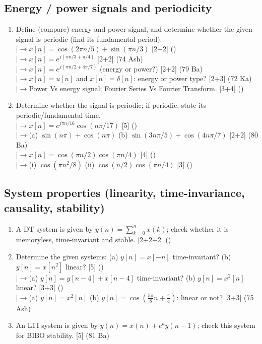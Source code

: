 \documentclass[12pt]{article}
\newcommand{\lb}{\\$\left|\rightarrow\right.$}
\begin{document}
  \subsection{Energy / power signals and periodicity}
    \begin{enumerate}[topsep=0pt, noitemsep]
      \item Define (compare) energy and power signal, and determine whether the given signal is periodic (find its fundamental period).
        \lb $x[n]=\cos(2\pi n/5)+\sin(\pi n/3)$ \hfill [2+2] ()
        \lb $x[n]=e^{j(\pi n/3+\pi/4)}$ \hfill [2+2] (74 Ash)
        \lb $x[n]=e^{j(\pi n/2+4\pi/7)}$ (energy or power?) \hfill [2+2] (79 Ba)
        \lb $x[n]=u[n]$ and $x[n]=\delta[n]$: energy or power type? \hfill [2+3] (72 Ka)
        \lb Power Vs energy signal; Fourier Series Vs Fourier Transform. \hfill [3+4] ()

      \item Determine whether the signal is periodic; if periodic, state its periodic/fundamental time.
        \lb $x[n]=e^{j\pi n/16}\cos(n\pi/17)$ \hfill [5] ()
        \lb (a) $\sin(n\pi)+\cos(n\pi)$ (b) $\sin(3n\pi/5)+\cos(4n\pi/7)$ \hfill [2+2] (80 Ba)
        \lb $x[n]=\cos(\pi n/2)\cos(\pi n/4)$ \hfill [4] ()
        \lb (i) $\cos(\pi n^2/8)$ (ii) $\cos(n/2)\cos(\pi n/4)$ \hfill [3] ()
    \end{enumerate}

  \subsection{System properties (linearity, time-invariance, causality, stability)}
    \begin{enumerate}[topsep=0pt, noitemsep]
      \item A DT system is given by $y(n)=\sum_{k=0}^{n}x(k)$; check whether it is memoryless, time-invariant and stable. \hfill [2+2+2] ()

      \item Determine the given systems: (a) $y[n]=x[-n]$ time-invariant? (b) $y[n]=x[n^2]$ linear? \hfill [5] ()
        \lb (a) $y[n]=y[n-4]+x[n-4]$ time-invariant? (b) $y[n]=x^2[n]$ linear? \hfill [3+3] ()
        \lb (a) $y[n]=x^2[n]$ (b) $y[n]=\cos(\tfrac{5\pi}{8}n+\tfrac{\pi}{4})$: linear or not? \hfill [3+3] (75 Ash)

      \item An LTI system is given by $y(n)=x(n)+e^{a}y(n-1)$; check this system for BIBO stability. \hfill [5] (81 Ba)
    \end{enumerate}
\end{document}
